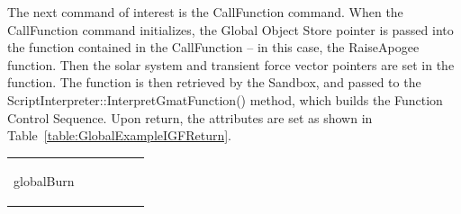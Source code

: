 The next command of interest is the CallFunction command.  When the CallFunction command
initializes, the Global Object Store pointer is passed into the function contained in the
CallFunction -- in this case, the RaiseApogee function.  Then the solar system and transient force
vector pointers are set in the function.  The function is then retrieved by the Sandbox, and passed
to the ScriptInterpreter::InterpretGmatFunction() method, which builds the Function Control
Sequence.  Upon return, the attributes are set as shown in Table~\ref{table:GlobalExampleIGFReturn}.

\begin{center}
\tablelasttail{\hline}
\begin{supertabular}{|p{0.95in}|p{0.95in}|p{0.95in}|p{0.95in}|p{0.95in}|p{0.95in}|}
\hline
\begin{small}
globalBurn


\end{small}
\end{supertabular}
\end{center}

